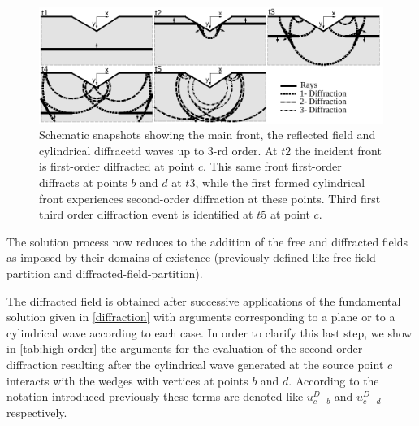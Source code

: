 \documentclass[11pt,letterpaper]{article}
\begin{document}
\begin{figure}[H]
\centering
\includegraphics[width=12cm]{IMAGES/00_Propuesta_3.pdf}
\caption{Schematic snapshots showing the main front, the reflected field and cylindrical diffracetd waves up to $3$-rd order. At $t2$ the incident front is first-order diffracted at point $c$. This same front first-order diffracts at points $b$ and $d$ at $t3$, while the first formed cylindrical front experiences second-order diffraction at these points. Third first third order diffraction event is identified at $t5$ at point $c$.}
\label{fig:highorder}
\end{figure}

The solution process now reduces to the addition of the free and diffracted fields as imposed by their domains of existence (previously defined like free-field-partition and diffracted-field-partition).

The diffracted field is obtained after successive applications of the fundamental solution given in \cref{diffraction} with arguments corresponding to a plane or to a cylindrical wave according to each case. In order to clarify this last step, we show in \cref{tab:high order} the arguments for the evaluation of the second order diffraction resulting after the cylindrical wave generated at the source point $c$ interacts with the wedges with vertices at points $b$ and $d$. According to the notation introduced previously these terms are denoted like $u^D_{c-b}$ and $u^D_{c-d}$ respectively.
\end{document}
